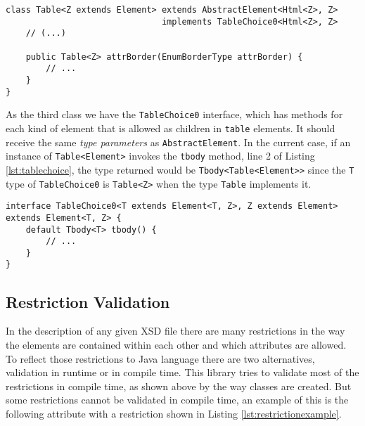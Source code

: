 \bigskip


\begin{minipage}{\linewidth}
\begin{lstlisting}[caption={Html Class Type Arguments},captionpos=b,label={lst:abstractelement}]
class Table<Z extends Element> extends AbstractElement<Html<Z>, Z>
                               implements TableChoice0<Html<Z>, Z>
    // (...)
    
    public Table<Z> attrBorder(EnumBorderType attrBorder) {
        // ...
    }
}
\end{lstlisting}
\end{minipage}

\noindent
As the third class we have the \texttt{TableChoice0} interface, which has methods for each kind of element that is allowed as children in \texttt{table} elements. It should receive the same \textit{type parameters} as \texttt{AbstractElement}. In the current case, if an instance of \texttt{Table<Element>} invokes the \texttt{tbody} method, line 2 of Listing \ref{lst:tablechoice}, the type returned would be \texttt{Tbody<Table<Element}\texttt{>}\texttt{>} since the \texttt{T} type of \texttt{TableChoice0} is \texttt{Table<Z>} when the type \texttt{Table} implements it.

\bigskip


\begin{minipage}{\linewidth}
\begin{lstlisting}[caption={TableChoice0 Interface Type Arguments},captionpos=b,label={lst:tablechoice}]
interface TableChoice0<T extends Element<T, Z>, Z extends Element> 		                                           extends Element<T, Z> {
    default Tbody<T> tbody() {
        // ...
    }
}
\end{lstlisting}
\end{minipage}

\subsection{Restriction Validation}
\label{sec:restrictionvalidation}

In the description of any given \ac{XSD} file there are many restrictions in the way the elements are contained within each other and which attributes are allowed. To reflect those restrictions to Java language there are two alternatives, validation in runtime or in compile time. This library tries to validate most of the restrictions in compile time, as shown above by the way classes are created. But some restrictions cannot be validated in compile time, an example of this is the following attribute with a restriction shown in Listing \ref{lst:restrictionexample}.

